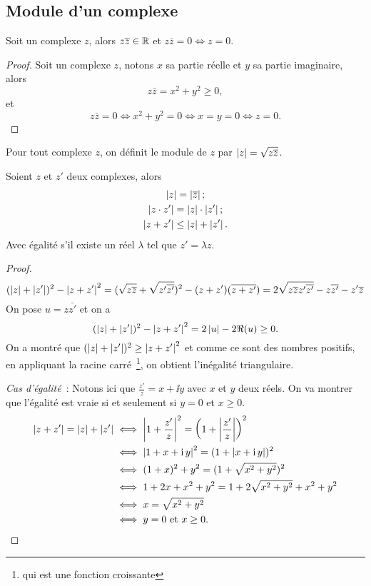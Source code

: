 \subsection{Module d'un complexe}
\label{subsec:modulecomplexe}
\begin{prop}
  Soit un complexe $z$, alors $z \overline{z} \in \mathbb{R}$ et $z \bar{z}=0 \iff z = 0$.
\end{prop}
\begin{proof}
  Soit un complexe $z$, notons $x$ sa partie réelle et $y$ sa partie imaginaire, alors
  \begin{equation}
    z \bar{z}=x^2+y^2 \geq 0,
  \end{equation}
  et
  \begin{equation}
    z \bar{z}=0 \iff x^2+y^2=0 \iff x=y=0 \iff z=0.
  \end{equation}
\end{proof}
%
\begin{defdef}
  Pour tout complexe $z$, on définit le module de $z$ par $\left\lvert z\right\rvert=\sqrt{z \overline{z}}$.
\end{defdef}
%
\begin{prop}
  Soient $z$ et $z'$ deux complexes, alors
  \begin{gather}
    \left\lvert z\right\rvert=\left\lvert\overline{z}\right\rvert; \\
    \left\lvert z \cdot z'\right\rvert=\left\lvert z\right\rvert \cdot \left\lvert z'\right\rvert; \\
    \left\lvert z+z'\right\rvert\leq\left\lvert z\right\rvert+\left\lvert z'\right\rvert.
  \end{gather}
  Avec égalité s'il existe un réel $\lambda$ tel que $z'=\lambda z$.
\end{prop}
\begin{proof}
  \begin{equation}
    (\left\lvert z\right\rvert+\left\lvert z'\right\rvert)^2-\left\lvert z+z'\right\rvert^2
    =(\sqrt{z \overline{z}} +\sqrt{z' \overline{z'}})^2 - (z+z')(\overline{z+z'})
    =2 \sqrt{z \overline{z} z' \overline{z'}} - z \overline{z'} - z'\overline{z}
  \end{equation}
  On pose $u=z \bar{z'}$ et on a
  \begin{equation}
    (\left\lvert z\right\rvert+\left\lvert z'\right\rvert)^2-\left\lvert z+z'\right\rvert^2=2 \left\lvert u\right\rvert-2 \Re(u) \geq 0.
  \end{equation}
  On a montré que $(\left\lvert z\right\rvert+\left\lvert z'\right\rvert)^2 \geq \left\lvert z+z'\right\rvert^2$ et comme ce sont des nombres positifs, en appliquant la racine carré~\footnote{qui est une fonction croissante}, on obtient l'inégalité triangulaire.

  \emph{Cas d'égalité}~: Notons ici que $\frac{z'}{z}=x + \ii y$ avec $x$ et $y$ deux réels. On va montrer que l'égalité est vraie si et seulement si $y=0$ et $x \geq 0$.
  \begin{align}
    \left\lvert z+z'\right\rvert=\left\lvert z\right\rvert+\left\lvert z'\right\rvert &\iff \left\lvert1+\frac{z'}{z}\right\rvert^2=\left(1+\left\lvert\frac{z'}{z}\right\rvert\right)^2 \\
    &\iff \left\lvert1+x+\operatorname{i} y\right\rvert^2 = (1+ \left\lvert x+ \operatorname{i} y\right\rvert)^2 \\
    &\iff (1+x)^2+y^2 = (1+\sqrt{x^2+y^2})^2 \\
    &\iff 1+2x+x^2+y^2 = 1 + 2\sqrt{x^2+y^2} + x^2+y^2 \\
    &\iff x = \sqrt{x^2+y^2}\\
    &\iff y=0 \text{~et~} x \geq 0.
  \end{align}
\end{proof}

